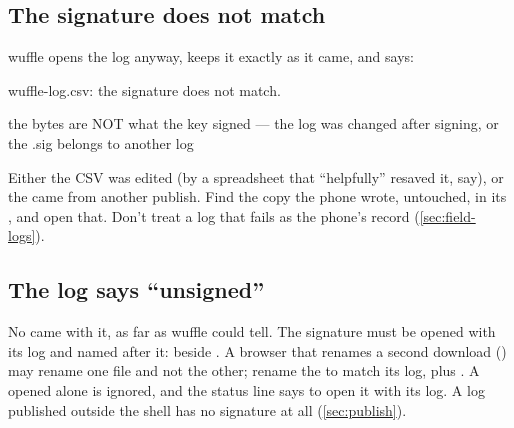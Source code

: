 \subsection{The signature does not match}

wuffle opens the log anyway, keeps it exactly as it came, and says:

\begin{codeblock}
wuffle-log.csv: the signature does not match.

the bytes are NOT what the key signed —
the log was changed after signing,
or the .sig belongs to another log
\end{codeblock}

Either the CSV was edited (by a spreadsheet that \enquote{helpfully} resaved it, say), or the
 came from another publish. Find the copy the phone wrote, untouched, in its
, and open that. Don't treat a log that fails as the phone's record
(\cref{sec:field-logs}).

\subsection{The log says \enquote{unsigned}}

No  came with it, as far as wuffle could tell. The signature must be opened with its log and
named after it:  beside . A browser that renames a second
download () may rename one file and not the other; rename the  to
match its log, plus . A  opened alone is ignored, and the status line says to open
it with its log. A log published outside the shell has no signature at all (\cref{sec:publish}).
